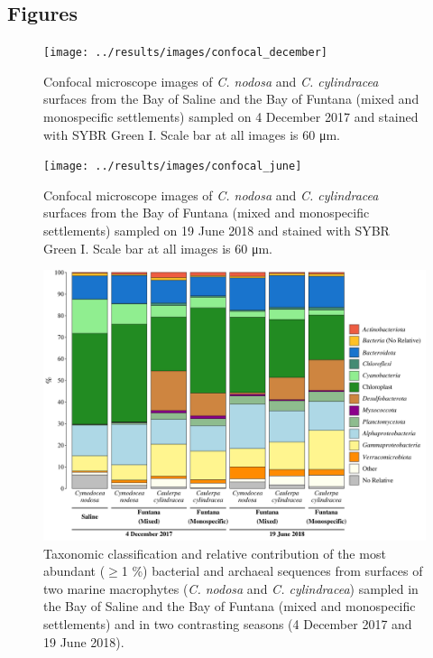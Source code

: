 \documentclass[12pt,]{article}
\begin{document}
\newpage

\hypertarget{figures}{%
\subsection{Figures}\label{figures}}

\begin{figure}[ht]

{\centering \texttt{[image: ../results/images/confocal\_december]} 

}

\caption{Confocal microscope images of \textit{C. nodosa} and \textit{C. cylindracea} surfaces from the Bay of Saline and the Bay of Funtana (mixed and monospecific settlements) sampled on 4 December 2017 and stained with SYBR Green I. Scale bar at all images is 60 \si{\um}.\label{confocal_december}}\label{fig:unnamed-chunk-1}
\end{figure}

\newpage
\begin{figure}[ht]

{\centering \texttt{[image: ../results/images/confocal\_june]} 

}

\caption{Confocal microscope images of \textit{C. nodosa} and \textit{C. cylindracea} surfaces from the Bay of Funtana (mixed and monospecific settlements) sampled on 19 June 2018 and stained with SYBR Green I. Scale bar at all images is 60 \si{\um}.\label{confocal_june}}\label{fig:unnamed-chunk-2}
\end{figure}

\newpage
\begin{figure}[ht]

{\centering \includegraphics[width=1\linewidth]{../results/figures/community_bar_plot} 

}

\caption{Taxonomic classification and relative contribution of the most abundant ($\geq$1 \si{\percent}) bacterial and archaeal sequences from surfaces of two marine macrophytes (\textit{C. nodosa} and \textit{C. cylindracea}) sampled in the Bay of Saline and the Bay of Funtana (mixed and monospecific settlements) and in two contrasting seasons (4 December 2017 and 19 June 2018).\label{community}}\label{fig:unnamed-chunk-3}
\end{figure}
\end{document}
